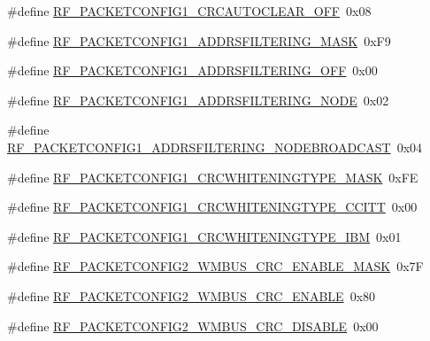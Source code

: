 \begin{DoxyCompactItemize}
\item 
\#define \hyperlink{sx1276Regs-Fsk_8h_a5657b8ed002c1fa8240195094ae616d3}{R\+F\+\_\+\+P\+A\+C\+K\+E\+T\+C\+O\+N\+F\+I\+G1\+\_\+\+C\+R\+C\+A\+U\+T\+O\+C\+L\+E\+A\+R\+\_\+\+O\+FF}~0x08
\item 
\#define \hyperlink{sx1276Regs-Fsk_8h_aa6ade0d8733661fe9b5909e83f82ff8d}{R\+F\+\_\+\+P\+A\+C\+K\+E\+T\+C\+O\+N\+F\+I\+G1\+\_\+\+A\+D\+D\+R\+S\+F\+I\+L\+T\+E\+R\+I\+N\+G\+\_\+\+M\+A\+SK}~0x\+F9
\item 
\#define \hyperlink{sx1276Regs-Fsk_8h_ae1c5b653c3eaf3484aa55b58fcd6f4f0}{R\+F\+\_\+\+P\+A\+C\+K\+E\+T\+C\+O\+N\+F\+I\+G1\+\_\+\+A\+D\+D\+R\+S\+F\+I\+L\+T\+E\+R\+I\+N\+G\+\_\+\+O\+FF}~0x00
\item 
\#define \hyperlink{sx1276Regs-Fsk_8h_a5ead47f6e17c82b0ac7cb3d9c0f63f7c}{R\+F\+\_\+\+P\+A\+C\+K\+E\+T\+C\+O\+N\+F\+I\+G1\+\_\+\+A\+D\+D\+R\+S\+F\+I\+L\+T\+E\+R\+I\+N\+G\+\_\+\+N\+O\+DE}~0x02
\item 
\#define \hyperlink{sx1276Regs-Fsk_8h_aa303faf2ff47ba50805b1f4f51f6d012}{R\+F\+\_\+\+P\+A\+C\+K\+E\+T\+C\+O\+N\+F\+I\+G1\+\_\+\+A\+D\+D\+R\+S\+F\+I\+L\+T\+E\+R\+I\+N\+G\+\_\+\+N\+O\+D\+E\+B\+R\+O\+A\+D\+C\+A\+ST}~0x04
\item 
\#define \hyperlink{sx1276Regs-Fsk_8h_a8062626f245aa20c2a325b831b908f0f}{R\+F\+\_\+\+P\+A\+C\+K\+E\+T\+C\+O\+N\+F\+I\+G1\+\_\+\+C\+R\+C\+W\+H\+I\+T\+E\+N\+I\+N\+G\+T\+Y\+P\+E\+\_\+\+M\+A\+SK}~0x\+FE
\item 
\#define \hyperlink{sx1276Regs-Fsk_8h_a618462d2aed522dc17aaa596d7dd982d}{R\+F\+\_\+\+P\+A\+C\+K\+E\+T\+C\+O\+N\+F\+I\+G1\+\_\+\+C\+R\+C\+W\+H\+I\+T\+E\+N\+I\+N\+G\+T\+Y\+P\+E\+\_\+\+C\+C\+I\+TT}~0x00
\item 
\#define \hyperlink{sx1276Regs-Fsk_8h_abb45d698c0e2e726d9754315bd4d3829}{R\+F\+\_\+\+P\+A\+C\+K\+E\+T\+C\+O\+N\+F\+I\+G1\+\_\+\+C\+R\+C\+W\+H\+I\+T\+E\+N\+I\+N\+G\+T\+Y\+P\+E\+\_\+\+I\+BM}~0x01
\item 
\#define \hyperlink{sx1276Regs-Fsk_8h_a57d39324128c8750f93dabdbdff3f22a}{R\+F\+\_\+\+P\+A\+C\+K\+E\+T\+C\+O\+N\+F\+I\+G2\+\_\+\+W\+M\+B\+U\+S\+\_\+\+C\+R\+C\+\_\+\+E\+N\+A\+B\+L\+E\+\_\+\+M\+A\+SK}~0x7F
\item 
\#define \hyperlink{sx1276Regs-Fsk_8h_a5c8e0ba4aa3a5fe54ad3bc55a8119856}{R\+F\+\_\+\+P\+A\+C\+K\+E\+T\+C\+O\+N\+F\+I\+G2\+\_\+\+W\+M\+B\+U\+S\+\_\+\+C\+R\+C\+\_\+\+E\+N\+A\+B\+LE}~0x80
\item 
\#define \hyperlink{sx1276Regs-Fsk_8h_aa806ad7df0d57492cde33c501aff3861}{R\+F\+\_\+\+P\+A\+C\+K\+E\+T\+C\+O\+N\+F\+I\+G2\+\_\+\+W\+M\+B\+U\+S\+\_\+\+C\+R\+C\+\_\+\+D\+I\+S\+A\+B\+LE}~0x00

\end{DoxyCompactItemize}
